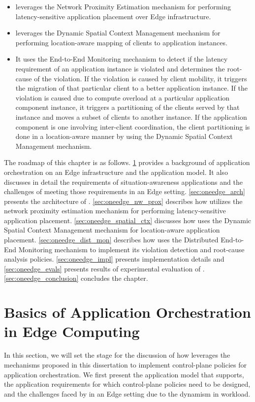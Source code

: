 \begin{itemize}
\item \oneedge{} leverages the Network Proximity Estimation mechanism for performing latency-sensitive application placement over Edge infrastructure. 
\item \oneedge{} leverages the Dynamic Spatial Context Management mechanism for performing location-aware mapping of clients to application instances. 
\item It uses the End-to-End Monitoring mechanism to detect if the latency requirement of an application instance is violated and determines the root-cause of the violation. If the violation is caused by client mobility, it triggers the migration of that particular client to a better application instance. If the violation is caused due to compute overload at a particular application component instance, it triggers a partitioning of the clients served by that instance and moves a subset of clients to another instance. If the application component is one involving inter-client coordination, the client partitioning is done in a location-aware manner by using the Dynamic Spatial Context Management mechanism.
\end{itemize}
 The roadmap of this chapter is as follows. \cref{sec:oneedge_background} provides a background of application orchestration on an Edge infrastructure and the application model. It also discusses in detail the requirements of situation-awareness applications and the challenges of meeting those requirements in an Edge setting. \cref{sec:oneedge_arch} presents the architecture of \oneedge{}. \cref{sec:oneedge_nw_prox} describes how \oneedge{} utilizes the network proximity estimation mechanism for performing latency-sensitive application placement. \cref{sec:oneedge_spatial_ctx} discusses how \oneedge{} uses  the Dynamic Spatial Context Management mechanism for location-aware application placement. \cref{sec:oneedge_dist_mon} describes how \oneedge{} uses the Distributed End-to-End Monitoring mechanism to implement its violation detection and root-cause analysis policies. \cref{sec:oneedge_impl} presents implementation details and \cref{sec:oneedge_evals} presents results of experimental evaluation of \oneedge{}. \cref{sec:oneedge_conclusion} concludes the chapter.



\section{Basics of Application Orchestration in Edge Computing}
\label{sec:oneedge_background}
In this section, we will set the stage for the discussion of how \oneedge{} leverages the mechanisms proposed in this dissertation to implement control-plane policies for application orchestration. We first present the application model that \oneedge{} supports, the application requirements for which control-plane policies need to be designed, and the challenges faced by in an Edge setting due to the dynamism in workload.

